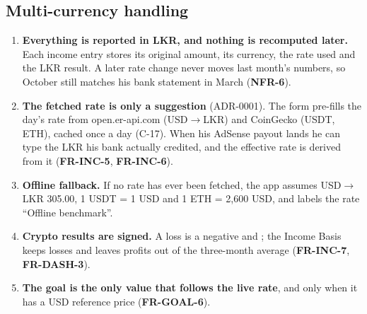 \documentclass[11pt,a4paper]{article}
\newcommand{\req}[1]{\textsf{\textbf{\color{pfgreendark}#1}}}
\begin{document}
\subsection{Multi-currency handling}
\begin{enumerate}
  \item \textbf{Everything is reported in LKR, and nothing is recomputed later.} Each income entry stores its original amount, its currency, the rate used and the LKR result. A later rate change never moves last month's numbers, so October still matches his bank statement in March (\req{NFR-6}).
  \item \textbf{The fetched rate is only a suggestion} (ADR-0001). The form pre-fills the day's rate from open.er-api.com (USD$\rightarrow$LKR) and CoinGecko (USDT, ETH), cached once a day (C-17). When his AdSense payout lands he can type the LKR his bank actually credited, and the effective rate is derived from it (\req{FR-INC-5}, \req{FR-INC-6}).
  \item \textbf{Offline fallback.} If no rate has ever been fetched, the app assumes USD$\rightarrow$LKR 305.00, 1 USDT = 1 USD and 1 ETH = 2,600 USD, and labels the rate ``Offline benchmark''.
  \item \textbf{Crypto results are signed.} A loss is a negative  and ; the Income Basis keeps losses and leaves profits out of the three-month average (\req{FR-INC-7}, \req{FR-DASH-3}).
  \item \textbf{The goal is the only value that follows the live rate}, and only when it has a USD reference price (\req{FR-GOAL-6}).
\end{enumerate}
\end{document}
